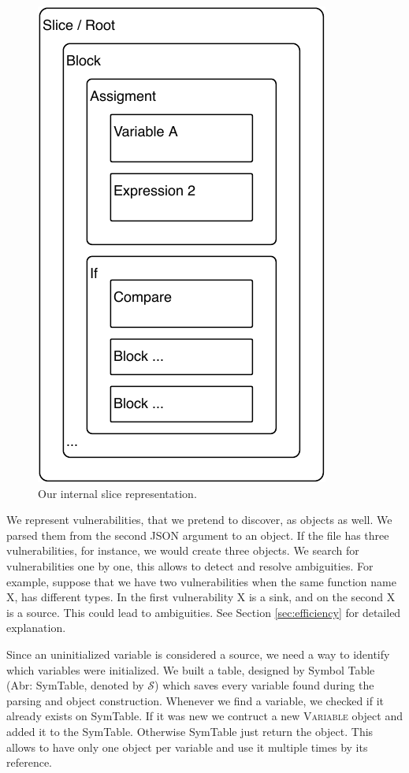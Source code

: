 \begin{figure}
    \centering
    \includegraphics[width=.8\linewidth]{figures/representation.pdf}
    \caption{Our internal slice representation.}
    \label{fig:representation}
\end{figure}

We represent vulnerabilities, that we pretend to discover, as objects as well. We parsed them from the 
second JSON argument to an object. If the file has three vulnerabilities, for instance, we would create
three objects. We search for vulnerabilities one by one, this allows to detect and resolve ambiguities.
For example, suppose that we have two vulnerabilities when the same function name X, has different types.
In the first vulnerability X is a sink, and on the second X is a source. This could lead to ambiguities.
See Section \ref{sec:efficiency} for detailed explanation.

Since an uninitialized variable is considered a source, we need a way to identify which variables were
initialized. We built a table, designed by Symbol Table (Abr: SymTable, denoted by $\mathcal{S}$) which 
saves every variable found during the parsing and object construction.
Whenever we find a variable, we checked if it already exists on SymTable. If it was new we contruct a
new \textsc{Variable} object and added it to the SymTable. Otherwise SymTable just return the object.
This allows to have only one object per variable and use it multiple times by its reference.

